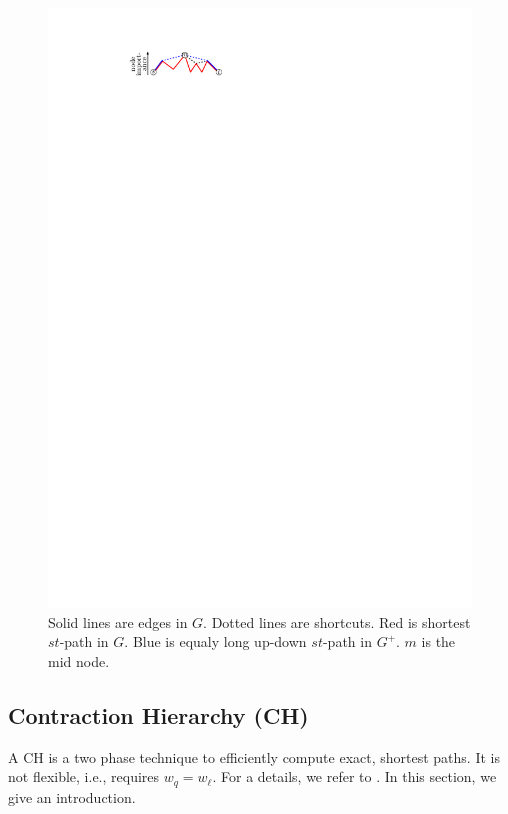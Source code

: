 \documentclass[a4paper,USenglish,cleveref, autoref, thm-restate]{lipics-v2019}
\begin{document}
\begin{figure}
\centering
\includegraphics{fig/ch}
\caption{
Solid lines are edges in $G$. Dotted lines are shortcuts. Red is shortest $st$-path in $G$. Blue is equaly long up-down $st$-path in $G^+$. $m$ is the mid node.
}
\label{fig:ch}
\end{figure}

\subsection{Contraction Hierarchy (CH)}

A CH is a two phase technique to efficiently compute exact, shortest paths.
It is not flexible, i.e., requires $w_q=w_\ell$.
For a details, we refer to \cite{gssv-erlrn-12,dsw-cch-15}.
In this section, we give an introduction.
\end{document}
